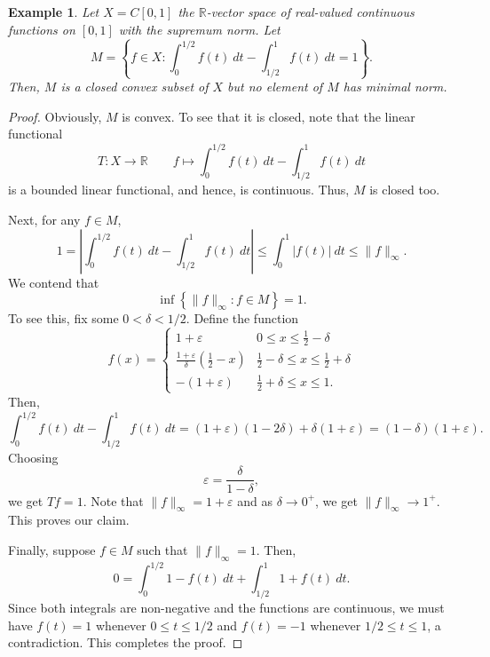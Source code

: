 \documentclass[12pt]{article}
\theoremstyle{thmstyle}
\theoremstyle{defstyle}
\newtheorem{example}[theorem]{Example}
\newcommand{\R}{\mathbb{R}}
\renewcommand{\le}{\leqslant}
\begin{document}
\begin{example}
    Let $X = C[0, 1]$ the $\R$-vector space of real-valued continuous functions on $[0, 1]$ with the supremum norm. Let 
    \begin{equation*}
        M = \left\{f\in X\colon \int_0^{1/2} f(t)~dt - \int_{1/2}^1 f(t)~dt = 1\right\}.
    \end{equation*}
    Then, $M$ is a closed convex subset of $X$ but no element of $M$ has minimal norm.
\end{example}
\begin{proof}
    Obviously, $M$ is convex. To see that it is closed, note that the linear functional 
    \begin{equation*}
        T: X\to\R\qquad f\mapsto \int_0^{1/2} f(t)~dt - \int_{1/2}^1 f(t)~dt
    \end{equation*}
    is a bounded linear functional, and hence, is continuous. Thus, $M$ is closed too.

    Next, for any $f\in M$,
    \begin{equation*}
        1 = \left|\int_0^{1/2} f(t)~dt - \int_{1/2}^1 f(t)~dt\right|\le\int_0^1|f(t)|~dt\le \|f\|_\infty.
    \end{equation*}
    We contend that 
    \begin{equation*}
        \inf\left\{\|f\|_\infty\colon f\in M\right\} = 1.
    \end{equation*}
    To see this, fix some $0 < \delta < 1/2$. Define the function 
    \begin{equation*}
        f(x) = 
        \begin{cases}
            1 + \varepsilon & 0\le x\le \frac{1}{2} - \delta\\
            \frac{1 + \varepsilon}{\delta}\left(\frac{1}{2} - x\right) & \frac{1}{2} - \delta\le x\le \frac{1}{2} + \delta\\
            -(1 + \varepsilon) & \frac{1}{2} + \delta\le x\le 1.
        \end{cases}
    \end{equation*}
    Then,
    \begin{equation*}
        \int_0^{1/2} f(t)~dt - \int_{1/2}^1 f(t)~dt = (1 + \varepsilon)(1 - 2\delta) + \delta(1 + \varepsilon) = (1 - \delta)(1 + \varepsilon).
    \end{equation*}
    Choosing 
    \begin{equation*}
        \varepsilon = \frac{\delta}{1 - \delta},
    \end{equation*}
    we get $Tf = 1$. Note that $\|f\|_\infty = 1 + \varepsilon$ and as $\delta\to 0^+$, we get $\|f\|_\infty\to 1^+$. This proves our claim.

    Finally, suppose $f\in M$ such that $\|f\|_\infty = 1$. Then, 
    \begin{equation*}
        0 = \int_{0}^{1/2}1 - f(t)~dt + \int_{1/2}^1 1 + f(t)~dt.
    \end{equation*}
    Since both integrals are non-negative and the functions are continuous, we must have $f(t) = 1$ whenever $0\le t\le 1/2$ and $f(t) = -1$ whenever $1/2\le t\le 1$, a contradiction. This completes the proof.
\end{proof}
\end{document}
